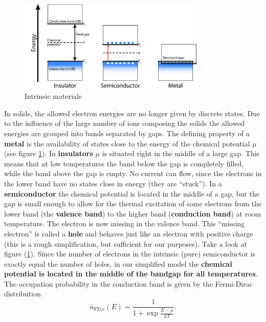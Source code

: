 \documentclass[11pt]{article}
\begin{document}
\begin{figure}[h]
\centering
\includegraphics[width=0.8\textwidth]{band_theory.jpg}
\caption{Intrinsic materials}
\label{gaps}
\end{figure}
In solids, the allowed electron energies are no longer given by discrete states. Due to the influence of the large number of ions composing the solids the allowed energies are grouped into bands separated by gaps. The defining property of a \textbf{metal} is the availability of states close to the energy of the chemical potential $\mu$ (see figure \ref{gaps}). In \textbf{insulators} $\mu$ is situated right in the middle of a large gap. This means that at low temperatures the band below the gap is completely filled, while the band above the gap is empty. No current can flow, since the electrons in the lower band have no states close in energy (they are ``stuck''). In a \textbf{semiconductor} the chemical potential is located in the middle of a gap, but the gap is small enough to allow for the thermal excitation of some electrons from the lower band (the {\bf valence band}) to the higher band ({\bf conduction band}) at room temperature. The electron is now missing in the valence band. This ``missing electron'' is called a {\bf hole} and behaves just like an electron with positive charge (this is a rough simplification, but sufficient for our purposes). Take a look at figure (\ref{gaps}). Since the number of electrons in the intrinsic (pure) semiconductor is exactly equal the number of holes, in our simplified model the {\bf chemical potential is located in the middle of the bandgap for all temperatures}. The occupation probability in the conduction band is given by the Fermi-Dirac distribution
$$ \bar {n}_\text{FD,e}(E)=\frac{1}{1+\exp{\frac{E-\mu}{k T}}}.$$ 
\end{document}
